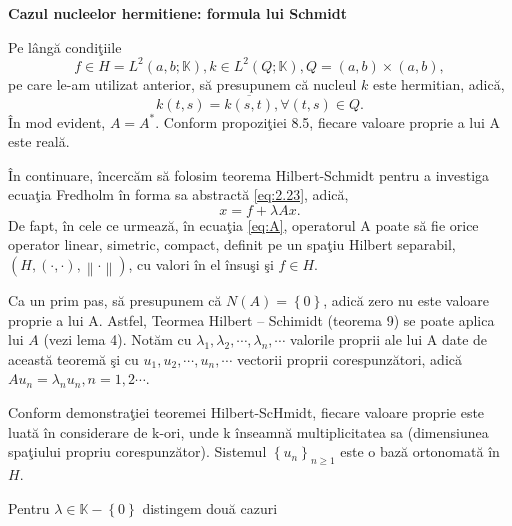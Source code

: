 \documentclass[a4paper,12pt,oneside]{report}
\begin{document}
\textbf{Cazul nucleelor hermitiene: formula lui Schmidt }

\noindent Pe l\^{a}ng\u{a} condi\c{t}iile
\begin{displaymath}
f\in H = L^{2}\left ( a,b;\mathbb{K} \right ), k\in L^{2}\left ( Q;\mathbb{K} \right ), Q = \left ( a,b \right )\times \left ( a,b \right ),
\end{displaymath}
pe care le-am utilizat anterior, s\u{a} presupunem c\u{a} nucleul \(k\) este hermitian, adic\u{a},
\begin{displaymath}
k\left ( t,s \right ) = \overline{k\left ( s,t \right )}, \forall \left ( t,s \right ) \in Q.
\end{displaymath}
\^{I}n mod evident, \(A = A^{\ast }\). Conform propozi\c{t}iei 8.5, fiecare valoare proprie a lui A este real\u{a}.

\noindent \^{I}n continuare, \^{i}ncerc\u{a}m s\u{a} folosim teorema Hilbert-Schmidt pentru a investiga ecua\c{t}ia Fredholm \^{i}n forma sa abstract\u{a} \ref{eq:2.23}, adic\u{a},
\begin{displaymath}
x = f + \lambda Ax. \label{eq:A} \tag{A}
\end{displaymath}
De fapt, \^{i}n cele ce urmeaz\u{a}, \^{i}n ecua\c{t}ia \ref{eq:A}, operatorul A poate s\u{a} fie orice operator linear, simetric, compact, definit pe un spa\c{t}iu Hilbert separabil, \(\left ( H, \left ( \cdot ,\cdot  \right ), \left \| \cdot  \right \| \right )\), cu valori \^{i}n el \^{i}nsu\c{s}i \c{s}i \(f \in H\).

\noindent Ca un prim pas, s\u{a} presupunem c\u{a} \(N\left ( A  \right ) = \left \{ 0 \right \}\), adic\u{a} zero nu este valoare proprie a lui A. Astfel, Teormea Hilbert – Schimidt (teorema 9) se poate aplica lui \(A\) (vezi lema 4). Not\u{a}m cu \(\lambda _{1}, \lambda _{2}, \cdots,\lambda _{n},\cdots\) valorile proprii ale lui A date de aceast\u{a} teorem\u{a} \c{s}i cu \(u_{1},u_{2},\cdots,u_{n},\cdots\) vectorii proprii corespunz\u{a}tori, adic\u{a} \(Au_{n} = \lambda_{n}u_{n}, n = 1,2\cdots\).

Conform demonstra\c{t}iei teoremei Hilbert-ScHmidt, fiecare valoare proprie este luat\u{a} \^{i}n considerare de k-ori, unde k \^{i}nseamn\u{a} multiplicitatea sa (dimensiunea spa\c{t}iului propriu corespunz\u{a}tor). Sistemul \(\left \{ u_{n} \right \}_{n\geq 1}\) este o baz\u{a} ortonomat\u{a} \^{i}n \(H\).

\noindent Pentru \(\lambda \in \mathbb{K} - \left \{ 0 \right \}\) distingem dou\u{a} cazuri
\end{document}
